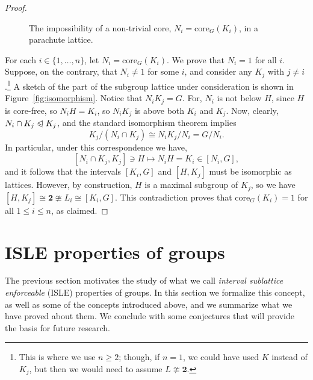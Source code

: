 \documentclass[cm,dissertation,actual,final]{uhthesis}
\theoremstyle{plain}
\theoremstyle{definition}
\newcounter{claim}
\newcounter{conjecture}
\theoremstyle{remark}
\numberwithin{theorem}{section}
\numberwithin{claim}{chapter}
\numberwithin{equation}{section}
\numberwithin{conjecture}{chapter}
\newcommand{\<}{\ensuremath{\langle}}
\renewcommand{\>}{\ensuremath{\rangle}}
\renewcommand{\leq}{\ensuremath{\leqslant}}
\renewcommand{\geq}{\ensuremath{\geqslant}}
\newcommand{\subnormal}{\ensuremath{\trianglelefteqslant}}
\newcommand{\core}{\ensuremath{\mathrm{core}}}
\newcommand{\0}{\ensuremath{\mathbf{0}}}
\newcommand{\1}{\ensuremath{\mathbf{1}}}
\newcommand{\2}{\ensuremath{\mathbf{2}}}
\newcommand{\3}{\ensuremath{\mathbf{3}}}
\newcommand{\4}{\ensuremath{\mathbf{4}}}
\newcommand{\5}{\ensuremath{\mathbf{5}}}
\newcommand{\ISLE}{{\small ISLE}}
\newcommand{\two}{\ensuremath{\mathbf{2}}}
\begin{document}
\begin{proof}
\begin{figure}[!h]
\caption{The impossibility of a non-trivial core, $N_i = \core_G(K_i)$, in a parachute lattice.}
\end{figure}

For each $i\in\{1, \dots, n\}$, let $N_i = \core_G(K_i)$.  We prove that
$N_i=1$ for all $i$.  Suppose, on the contrary, that $N_i \neq 1$ for some
$i$, and consider any $K_j$ with $j\neq i$.\footnote{This is where we use $n\geq
  2$; though, if $n=1$, we could have used $K$ instead of $K_j$, but then we
  would need to assume $L\ncong \two$.}
A sketch of the part of the subgroup lattice under consideration is shown in
Figure~\ref{fig:isomorphism}. 
Notice that $N_i K_j = G$. For, $N_i$ is not below $H$, since
$H$ is core-free, so $N_i H = K_i$, so
$N_i K_j$ is above both $K_i$ and $K_j$.
Now, clearly,
$N_i\cap K_j\subnormal K_j$, and 
the standard isomorphism theorem implies
\[
K_j/(N_i\cap K_j)
\cong 
N_i K_j/N_i =
G/N_i.
\]
In particular, under this correspondence we have, 
\[
[N_i\cap K_j, K_j] \ni H \mapsto N_i H = K_i \in [N_i, G],
\]
and it follows that the intervals $[K_i, G]$ and $[H, K_j]$ must be isomorphic
as lattices.  However, by construction, 
$H$ is a maximal subgroup of $K_j$, so we have
$[H, K_j]\cong \two \ncong L_i  \cong [K_i, G]$.
This contradiction proves that $\core_G(K_i) = 1$ for all $1\leq i\leq n$, as claimed.
\end{proof}

\section{ISLE properties of groups}
\label{sec:isle-prop-groups}
The previous section motivates the study of what we call
\emph{interval sublattice enforceable} (\ISLE) properties of groups.  In this section we
formalize this concept, as well as some of the concepts introduced above, and we summarize
what we have proved about them.  We conclude with some conjectures that 
will provide the basis for future research.
\end{document}
